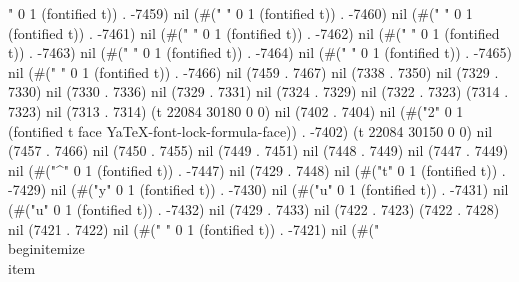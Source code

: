" 0 1 (fontified t)) . -7459) nil (#(" " 0 1 (fontified t)) . -7460) nil (#(" " 0 1 (fontified t)) . -7461) nil (#(" " 0 1 (fontified t)) . -7462) nil (#(" " 0 1 (fontified t)) . -7463) nil (#(" " 0 1 (fontified t)) . -7464) nil (#(" " 0 1 (fontified t)) . -7465) nil (#(" " 0 1 (fontified t)) . -7466) nil (7459 . 7467) nil (7338 . 7350) nil (7329 . 7330) nil (7330 . 7336) nil (7329 . 7331) nil (7324 . 7329) nil (7322 . 7323) (7314 . 7323) nil (7313 . 7314) (t 22084 30180 0 0) nil (7402 . 7404) nil (#("2" 0 1 (fontified t face YaTeX-font-lock-formula-face)) . -7402) (t 22084 30150 0 0) nil (7457 . 7466) nil (7450 . 7455) nil (7449 . 7451) nil (7448 . 7449) nil (7447 . 7449) nil (#("^" 0 1 (fontified t)) . -7447) nil (7429 . 7448) nil (#("t" 0 1 (fontified t)) . -7429) nil (#("y" 0 1 (fontified t)) . -7430) nil (#("u" 0 1 (fontified t)) . -7431) nil (#("u" 0 1 (fontified t)) . -7432) nil (7429 . 7433) nil (7422 . 7423) (7422 . 7428) nil (7421 . 7422) nil (#("
" 0 1 (fontified t)) . -7421) nil (#("       \\begin{itemize}
        \\item 

